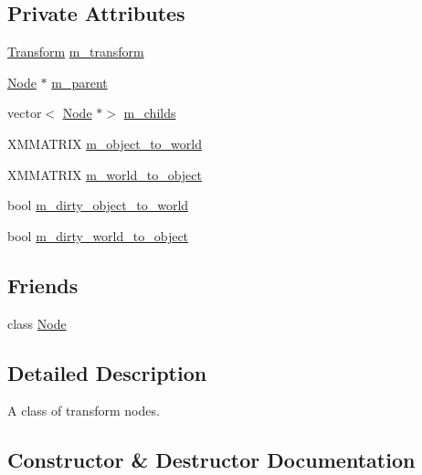 \subsection*{Private Attributes}
\begin{DoxyCompactItemize}
\item 
\hyperlink{classmage_1_1_transform}{Transform} \hyperlink{classmage_1_1_transform_node_aa93f15e689cc9c938acfc260dc71c136}{m\+\_\+transform}
\item 
\hyperlink{classmage_1_1_node}{Node} $\ast$ \hyperlink{classmage_1_1_transform_node_afad4b8198a5e4b1a3c46fb8e51fd17c2}{m\+\_\+parent}
\item 
vector$<$ \hyperlink{classmage_1_1_node}{Node} $\ast$$>$ \hyperlink{classmage_1_1_transform_node_a0f6be1bd433b1c7226dac7f865dca3a3}{m\+\_\+childs}
\item 
X\+M\+M\+A\+T\+R\+IX \hyperlink{classmage_1_1_transform_node_a79de447d6d40226d7ceb276007f5fbeb}{m\+\_\+object\+\_\+to\+\_\+world}
\item 
X\+M\+M\+A\+T\+R\+IX \hyperlink{classmage_1_1_transform_node_ade413fc9a980ce8e1191c17f94f25e3f}{m\+\_\+world\+\_\+to\+\_\+object}
\item 
bool \hyperlink{classmage_1_1_transform_node_a389151fddc72499d0be4e725622d99b9}{m\+\_\+dirty\+\_\+object\+\_\+to\+\_\+world}
\item 
bool \hyperlink{classmage_1_1_transform_node_acb9046e0096ada337e1978f016daa144}{m\+\_\+dirty\+\_\+world\+\_\+to\+\_\+object}
\end{DoxyCompactItemize}
\subsection*{Friends}
\begin{DoxyCompactItemize}
\item 
class \hyperlink{classmage_1_1_transform_node_a6db9d28bd448a131448276ee03de1e6d}{Node}
\end{DoxyCompactItemize}


\subsection{Detailed Description}
A class of transform nodes. 

\subsection{Constructor \& Destructor Documentation}
\hypertarget{classmage_1_1_transform_node_aec41a87ef5f7bca905e1de4b8959350a}{}\label{classmage_1_1_transform_node_aec41a87ef5f7bca905e1de4b8959350a} 
